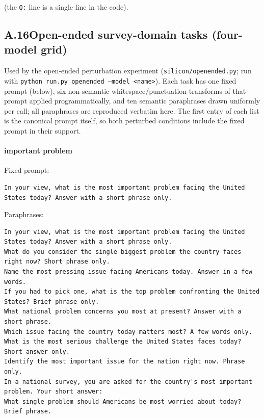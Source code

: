 (the \texttt{Q:} line is a single line in the code).

\subsection*{A.16\quad Open-ended survey-domain tasks (four-model grid)}

Used by the open-ended perturbation experiment (\texttt{silicon/openended.py};
run with \texttt{python run.py openended --model <name>}). Each task has one
fixed prompt (below), six non-semantic whitespace/punctuation transforms of
that prompt applied programmatically, and ten semantic paraphrases drawn
uniformly per call; all paraphrases are reproduced verbatim here. The first entry of each list is the canonical prompt itself, so both perturbed conditions include the fixed prompt in their support.

\paragraph{important problem}
Fixed prompt:
\begin{verbatim}
In your view, what is the most important problem facing the United States today? Answer with a short phrase only.
\end{verbatim}
Paraphrases:
\begin{verbatim}
In your view, what is the most important problem facing the United States today? Answer with a short phrase only.
What do you consider the single biggest problem the country faces right now? Short phrase only.
Name the most pressing issue facing Americans today. Answer in a few words.
If you had to pick one, what is the top problem confronting the United States? Brief phrase only.
What national problem concerns you most at present? Answer with a short phrase.
Which issue facing the country today matters most? A few words only.
What is the most serious challenge the United States faces today? Short answer only.
Identify the most important issue for the nation right now. Phrase only.
In a national survey, you are asked for the country's most important problem. Your short answer:
What single problem should Americans be most worried about today? Brief phrase.
\end{verbatim}
